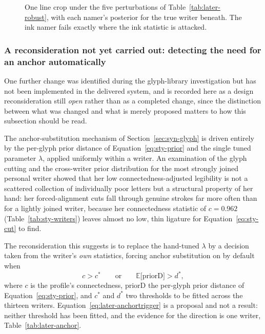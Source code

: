 \begin{figure}[htb]
\centering
{}
\caption{One line crop under the five perturbations of Table~\ref{tab:later-robust}, with each namer's posterior for the true writer beneath. The ink namer fails exactly where the ink statistic is attacked.}
\label{fig:later-perturb}
\end{figure}

\subsubsection{A reconsideration not yet carried out: detecting the need for an anchor automatically}
\label{sec:later-anchor}

One further change was identified during the glyph-library investigation but has not been implemented in the delivered system, and is recorded here as a design reconsideration still \emph{open} rather than as a completed change, since the distinction between what was changed and what is merely proposed matters to how this subsection should be read.

The anchor-substitution mechanism of Section~\ref{sec:syn-glyph} is driven entirely by the per-glyph prior distance of Equation~\ref{eq:sty-prior} and the single tuned parameter $\lambda$, applied uniformly within a writer. An examination of the glyph cutting and the cross-writer prior distribution for the most strongly joined personal writer showed that her low connectedness-adjusted legibility is not a scattered collection of individually poor letters but a structural property of her hand: her forced-alignment cuts fall through genuine strokes far more often than for a lightly joined writer, because her connectedness statistic of $c=0.962$ (Table~\ref{tab:sty-writers}) leaves almost no low, thin ligature for Equation~\ref{eq:sty-cut} to find.

The reconsideration this suggests is to replace the hand-tuned $\lambda$ by a decision taken from the writer's \emph{own} statistics, forcing anchor substitution on by default when
\begin{equation}
c>c^{*}\qquad\text{or}\qquad \mathbb{E}\bigl[\mathrm{priorD}\bigr]>d^{*},
\label{eq:later-anchortrigger}
\end{equation}
where $c$ is the profile's connectedness, $\mathrm{priorD}$ the per-glyph prior distance of Equation~\ref{eq:sty-prior}, and $c^{*}$ and $d^{*}$ two thresholds to be fitted across the thirteen writers. Equation~\ref{eq:later-anchortrigger} is a proposal and not a result: neither threshold has been fitted, and the evidence for the direction is one writer, Table~\ref{tab:later-anchor}.

